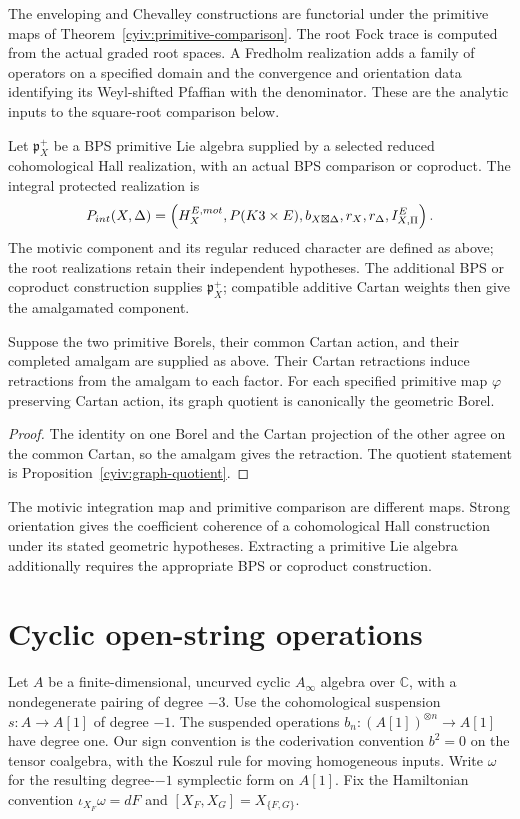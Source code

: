 The enveloping and Chevalley constructions are functorial under the
primitive maps of Theorem~\ref{cyiv:primitive-comparison}.
The root Fock trace is computed from the actual graded root spaces.
A Fredholm realization adds a family of operators on a specified domain
and the convergence and orientation data identifying its Weyl-shifted Pfaffian with
the denominator.
These are the analytic inputs to the square-root comparison below.

\begin{definition}
Let $\mathfrak p_X^+$ be a BPS primitive Lie algebra supplied by a
selected reduced cohomological Hall realization, with an actual BPS
comparison or coproduct.  The integral protected realization is
\[
 P_{int}(X,\Delta)
 =\left(
   H_X^{E,mot},
   P(K3\times E),
   b_{X\boxtimes\Delta},
   r_X,r_\Delta,
   I_{X,\Pi}^E
 \right).
\]
The motivic component and its regular reduced character are defined as above; the root realizations retain their independent hypotheses.  The additional BPS or coproduct construction supplies
$\mathfrak p_X^+$; compatible additive Cartan weights then give the
amalgamated component.
\end{definition}

\begin{proposition}
Suppose the two primitive Borels, their common Cartan action, and their
completed amalgam are supplied as above.
Their Cartan retractions induce retractions from the amalgam to each
factor.
For each specified primitive map $\varphi$ preserving Cartan action,
its graph quotient is canonically the geometric Borel.
\end{proposition}
\begin{proof}
The identity on one Borel and the Cartan projection of the other agree
on the common Cartan, so the amalgam gives the retraction.
The quotient statement is Proposition~\ref{cyiv:graph-quotient}.
\end{proof}

The motivic integration map and primitive comparison are different maps.
Strong orientation gives the coefficient coherence of a cohomological
Hall construction under its stated geometric hypotheses.
Extracting a primitive Lie algebra additionally requires the appropriate
BPS or coproduct construction.

\section{Cyclic open-string operations}
Let $A$ be a finite-dimensional, uncurved cyclic $A_\infty$ algebra
over $\mathbb C$, with a nondegenerate pairing of degree $-3$.
Use the cohomological suspension $s:A\to A[1]$ of degree $-1$.
The suspended operations $b_n:(A[1])^{\otimes n}\to A[1]$ have degree one.
Our sign convention is the coderivation convention $b^2=0$ on the
tensor coalgebra, with the Koszul rule for moving homogeneous inputs.
Write $\omega$ for the resulting degree-$-1$ symplectic form on $A[1]$.
Fix the Hamiltonian convention $\iota_{X_F}\omega=dF$ and
$[X_F,X_G]=X_{\{F,G\}}$.

